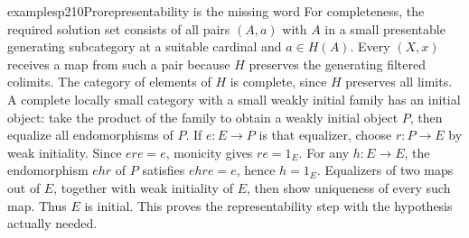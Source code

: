 \begin{dcomment}{examples}{p210}{Prorepresentability is the missing word}
For completeness, the required solution set consists of all pairs $(A,a)$ with $A$ in a small presentable generating subcategory at a suitable cardinal and $a\in H(A)$. Every $(X,x)$ receives a map from such a pair because $H$ preserves the generating filtered colimits. The category of elements of $H$ is complete, since $H$ preserves all limits. A complete locally small category with a small weakly initial family has an initial object: take the product of the family to obtain a weakly initial object $P$, then equalize all endomorphisms of $P$. If $e:E\to P$ is that equalizer, choose $r:P\to E$ by weak initiality. Since $ere=e$, monicity gives $re=1_E$. For any $h:E\to E$, the endomorphism $ehr$ of $P$ satisfies $ehre=e$, hence $h=1_E$. Equalizers of two maps out of $E$, together with weak initiality of $E$, then show uniqueness of every such map. Thus $E$ is initial. This proves the representability step with the hypothesis actually needed.
\end{dcomment}

